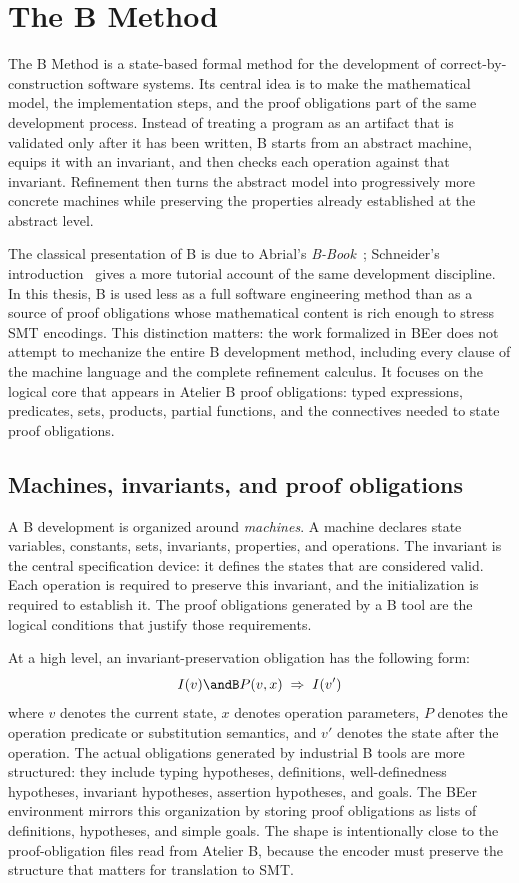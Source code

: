 \section{The B Method}
\label{sec:b-method}

The B Method is a state-based formal method for the development of correct-by-construction software systems.
Its central idea is to make the mathematical model, the implementation steps, and the proof obligations part of the same development process.
Instead of treating a program as an artifact that is validated only after it has been written, B starts from an abstract machine, equips it with an invariant, and then checks each operation against that invariant.
Refinement then turns the abstract model into progressively more concrete machines while preserving the properties already established at the abstract level.

The classical presentation of B is due to Abrial's \emph{B-Book}~\cite{abrial1996bbook}; Schneider's introduction~\cite{schneider2001bmethod} gives a more tutorial account of the same development discipline.
In this thesis, B is used less as a full software engineering method than as a source of proof obligations whose mathematical content is rich enough to stress SMT encodings.
This distinction matters: the work formalized in BEer does not attempt to mechanize the entire B development method, including every clause of the machine language and the complete refinement calculus.
It focuses on the logical core that appears in Atelier B proof obligations: typed expressions, predicates, sets, products, partial functions, and the connectives needed to state proof obligations.

\subsection{Machines, invariants, and proof obligations}

A B development is organized around \emph{machines}.
A machine declares state variables, constants, sets, invariants, properties, and operations.
The invariant is the central specification device: it defines the states that are considered valid.
Each operation is required to preserve this invariant, and the initialization is required to establish it.
The proof obligations generated by a B tool are the logical conditions that justify those requirements.

At a high level, an invariant-preservation obligation has the following form:
\[
  I(v) \andB P(v, x) \;\Rightarrow\; I(v')
\]
where \(v\) denotes the current state, \(x\) denotes operation parameters, \(P\) denotes the operation predicate or substitution semantics, and \(v'\) denotes the state after the operation.
The actual obligations generated by industrial B tools are more structured: they include typing hypotheses, definitions, well-definedness hypotheses, invariant hypotheses, assertion hypotheses, and goals.
The BEer environment mirrors this organization by storing proof obligations as lists of definitions, hypotheses, and simple goals.
The shape is intentionally close to the proof-obligation files read from Atelier B, because the encoder must preserve the structure that matters for translation to SMT.


